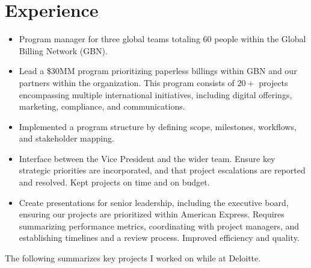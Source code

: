 \documentclass[11pt,letter]{moderncv}
\begin{document}
\makecvtitle
%
\vspace{-3.5em}
\section{Experience}
%
\begin{itemize}[label=\large\color{color1}{$\bullet$}]
  \item Program manager for three global teams totaling 60 people within the
    Global Billing Network (GBN).
  \item Lead a \$30MM program prioritizing paperless billings within GBN and our
    partners within the organization. This program consists of $20+$ projects
    encompassing multiple international initiatives, including digital
    offerings, marketing, compliance, and communications.
  \item Implemented a program structure by defining scope, milestones,
    workflows, and stakeholder mapping.
  \item Interface between the Vice President and the wider team.
    Ensure key strategic priorities are incorporated, and that project
    escalations are reported and resolved. Kept projects on time and on
    budget.
  \item Create presentations for senior leadership, including the executive
    board, ensuring our projects are prioritized within American Express. Requires
    summarizing performance metrics, coordinating with project
    managers, and establishing timelines and a review process. Improved efficiency and quality.
\end{itemize}
\medbreak
{}%
The following summarizes key projects I worked on while at Deloitte.
\end{document}
